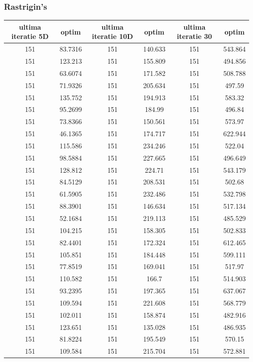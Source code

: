 \documentclass{article}
\begin{document}
\subsubsection{Rastrigin’s}
\begin{tabular}{cccccc}
\hline
ultima iteratie 5D& optim&ultima iteratie 10D& optim&ultima iteratie 30&optim\\
\hline
151&83.7316&151&140.633&151&543.864 \\ \hline
151&123.213&151&155.809&151&494.856 \\ \hline
151&63.6074&151&171.582&151&508.788 \\ \hline
151&71.9326&151&205.634&151&497.59 \\ \hline
151&135.752&151&194.913&151&583.32 \\ \hline
151&95.2699&151&184.99&151&496.84 \\ \hline
151&73.8366&151&150.561&151&573.97 \\ \hline
151&46.1365&151&174.717&151&622.944 \\ \hline
151&115.586&151&234.246&151&522.04 \\ \hline
151&98.5884&151&227.665&151&496.649 \\ \hline
151&128.812&151&224.71&151&543.179 \\ \hline
151&84.5129&151&208.531&151&502.68 \\ \hline
151&61.5905&151&232.486&151&532.798 \\ \hline
151&88.3901&151&146.634&151&517.134 \\ \hline
151&52.1684&151&219.113&151&485.529 \\ \hline
151&104.215&151&158.305&151&502.833 \\ \hline
151&82.4401&151&172.324&151&612.465 \\ \hline
151&105.851&151&184.448&151&599.111 \\ \hline
151&77.8519&151&169.041&151&517.97 \\ \hline
151&110.582&151&166.7&151&514.903 \\ \hline
151&93.2395&151&197.365&151&637.067 \\ \hline
151&109.594&151&221.608&151&568.779 \\ \hline
151&102.011&151&158.874&151&482.916 \\ \hline
151&123.651&151&135.028&151&486.935 \\ \hline
151&81.8224&151&195.549&151&570.15 \\ \hline
151&109.584&151&215.704&151&572.881 \\ \hline

\end{tabular}
\end{document}
